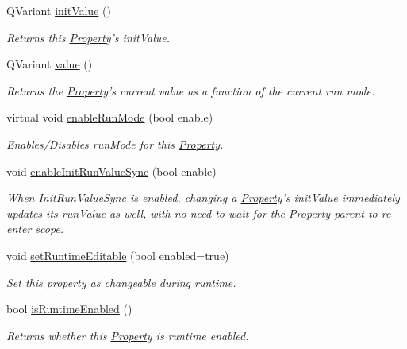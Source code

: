\begin{DoxyCompactItemize}
\item 
Q\-Variant \hyperlink{class_picto_1_1_property_a13332ce78a9ce11b496d38c13a857dc7}{init\-Value} ()
\begin{DoxyCompactList}\small\item\em Returns this \hyperlink{class_picto_1_1_property}{Property}'s init\-Value. \end{DoxyCompactList}\item 
Q\-Variant \hyperlink{class_picto_1_1_property_a69540c9d4f9a4b0b128b4c6a876d67ca}{value} ()
\begin{DoxyCompactList}\small\item\em Returns the \hyperlink{class_picto_1_1_property}{Property}'s current value as a function of the current run mode. \end{DoxyCompactList}\item 
virtual void \hyperlink{class_picto_1_1_property_aa102270174c3620cc62f38dc9b529c89}{enable\-Run\-Mode} (bool enable)
\begin{DoxyCompactList}\small\item\em Enables/\-Disables run\-Mode for this \hyperlink{class_picto_1_1_property}{Property}. \end{DoxyCompactList}\item 
void \hyperlink{class_picto_1_1_property_a3f7c0e0d81e687fccec996072d83418f}{enable\-Init\-Run\-Value\-Sync} (bool enable)
\begin{DoxyCompactList}\small\item\em When Init\-Run\-Value\-Sync is enabled, changing a \hyperlink{class_picto_1_1_property}{Property}'s init\-Value immediately updates its run\-Value as well, with no need to wait for the \hyperlink{class_picto_1_1_property}{Property} parent to re-\/enter scope. \end{DoxyCompactList}\item 
void \hyperlink{class_picto_1_1_property_add3e9d7a904e0b13242a23a78f698e9f}{set\-Runtime\-Editable} (bool enabled=true)
\begin{DoxyCompactList}\small\item\em Set this property as changeable during runtime. \end{DoxyCompactList}\item 
bool \hyperlink{class_picto_1_1_property_acdd6ce7db8943523198af6730aacc9b0}{is\-Runtime\-Enabled} ()
\begin{DoxyCompactList}\small\item\em Returns whether this \hyperlink{class_picto_1_1_property}{Property} is runtime enabled. \end{DoxyCompactList}\item 

\end{DoxyCompactItemize}
